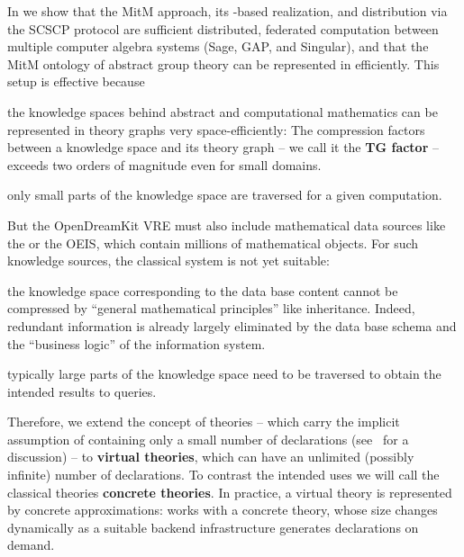 In \cite{KohMuePfe:kbimss17} we show that the MitM approach, its \ommt-based realization,
and distribution via the SCSCP protocol are sufficient distributed, federated computation
between multiple computer algebra systems (Sage, GAP, and Singular), and that the MitM
ontology of abstract group theory can be represented in \ommt efficiently. This setup is
effective because
\begin{compactitem}
\item the knowledge spaces behind abstract and computational mathematics can be
  represented in theory graphs very space-efficiently: The compression factors between a
  knowledge space and its theory graph -- we call it the \textbf{TG factor} --
  exceeds two orders of magnitude even for small domains.
\item only small parts of the knowledge space are traversed for a given computation. 
\end{compactitem}

But the \textsf{OpenDreamKit} VRE must also include mathematical data sources like the \lmfdb or
the OEIS, which contain millions of mathematical objects. For such knowledge sources, the
classical \mmt system is not yet suitable: 
\begin{compactitem}
\item the knowledge space corresponding to the data base content cannot be compressed by
  ``general mathematical principles'' like inheritance. Indeed, redundant information is
  already largely eliminated by the data base schema and the ``business logic'' of the
  information system.
\item typically large parts of the knowledge space need to be traversed to obtain the
  intended results to queries.
\end{compactitem}
Therefore, we extend the concept of \ommt theories -- which carry the implicit
assumption of containing only a small number of declarations (see~\cite{FaGu:lt92} for a
discussion) -- to \textbf{virtual theories}, which can have an unlimited (possibly infinite) number of
declarations.
To contrast the intended
uses we will call the classical \ommt theories \textbf{concrete theories}. 
In practice, a virtual theory is represented by concrete approximations: \ommt works with a concrete theory, whose size changes dynamically as a suitable backend infrastructure generates declarations on demand.


